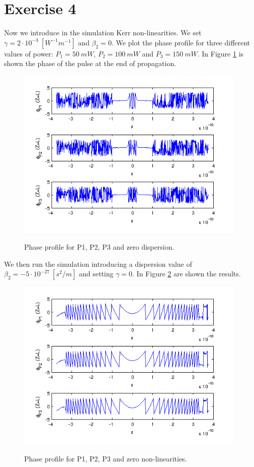 \documentclass[a4paper,10pt]{report}
\begin{document}
\section*{Exercise 4}
Now we introduce in the simulation Kerr non-linearities. We set $\gamma = 2\cdot 10^{-3} \ [W^{-1}m^{-1}]$ and
$\beta_2=0$. We plot the phase profile for three different values of power: $P_1=50 \ mW$, $P_2=100 \ mW$ and $P_3=150 \ mW$.
In Figure \ref{phase1} is shown the phase of the pulse at the end of propagation.

\begin{figure}[!ht]
  \centering
  \includegraphics[width=11cm]{es4_phaseb0.png}\\
  \caption{Phase profile for P1, P2, P3 and zero dispersion.}
  \label{phase1}
\end{figure}

We then run the simulation introducing a dispersion value of $\beta_2 = -5 \cdot 10^{-27} \ [s^2/m]$ and setting $\gamma = 0$.
In Figure \ref{phase3} are shown the results.
\begin{figure}[!ht]
  \centering
  \includegraphics[width=11cm]{es4_phasebnogam.png}\\
  \caption{Phase profile for P1, P2, P3 and zero non-linearities.}
  \label{phase3}
\end{figure}
\end{document}
